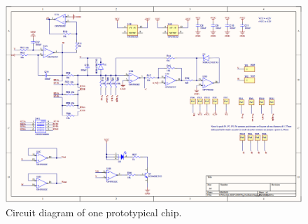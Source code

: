\begin{figure}[H]
    \centering
    \includegraphics[width=0.75\linewidth]
    {../1_block/prototypes/prototype_implementation.png}
    \caption{Circuit diagram of one prototypical chip.}
    \label{fig:prototype implementation}
\end{figure}

